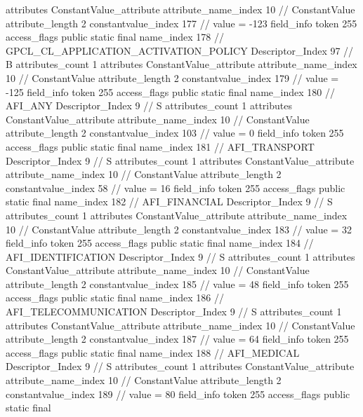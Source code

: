 {{{{{				attributes {
				ConstantValue_attribute {
					attribute_name_index	10		// ConstantValue
					attribute_length	2
					constantvalue_index	177		// value = -123
				}
				}
			}
			field_info {
				token	255
				access_flags	public static final
				name_index	178		// GPCL_CL_APPLICATION_ACTIVATION_POLICY
				Descriptor_Index	97		// B
				attributes_count	1
				attributes {
				ConstantValue_attribute {
					attribute_name_index	10		// ConstantValue
					attribute_length	2
					constantvalue_index	179		// value = -125
				}
				}
			}
			field_info {
				token	255
				access_flags	public static final
				name_index	180		// AFI_ANY
				Descriptor_Index	9		// S
				attributes_count	1
				attributes {
				ConstantValue_attribute {
					attribute_name_index	10		// ConstantValue
					attribute_length	2
					constantvalue_index	103		// value = 0
				}
				}
			}
			field_info {
				token	255
				access_flags	public static final
				name_index	181		// AFI_TRANSPORT
				Descriptor_Index	9		// S
				attributes_count	1
				attributes {
				ConstantValue_attribute {
					attribute_name_index	10		// ConstantValue
					attribute_length	2
					constantvalue_index	58		// value = 16
				}
				}
			}
			field_info {
				token	255
				access_flags	public static final
				name_index	182		// AFI_FINANCIAL
				Descriptor_Index	9		// S
				attributes_count	1
				attributes {
				ConstantValue_attribute {
					attribute_name_index	10		// ConstantValue
					attribute_length	2
					constantvalue_index	183		// value = 32
				}
				}
			}
			field_info {
				token	255
				access_flags	public static final
				name_index	184		// AFI_IDENTIFICATION
				Descriptor_Index	9		// S
				attributes_count	1
				attributes {
				ConstantValue_attribute {
					attribute_name_index	10		// ConstantValue
					attribute_length	2
					constantvalue_index	185		// value = 48
				}
				}
			}
			field_info {
				token	255
				access_flags	public static final
				name_index	186		// AFI_TELECOMMUNICATION
				Descriptor_Index	9		// S
				attributes_count	1
				attributes {
				ConstantValue_attribute {
					attribute_name_index	10		// ConstantValue
					attribute_length	2
					constantvalue_index	187		// value = 64
				}
				}
			}
			field_info {
				token	255
				access_flags	public static final
				name_index	188		// AFI_MEDICAL
				Descriptor_Index	9		// S
				attributes_count	1
				attributes {
				ConstantValue_attribute {
					attribute_name_index	10		// ConstantValue
					attribute_length	2
					constantvalue_index	189		// value = 80
				}
				}
			}
			field_info {
				token	255
				access_flags	public static final
}}}}}
